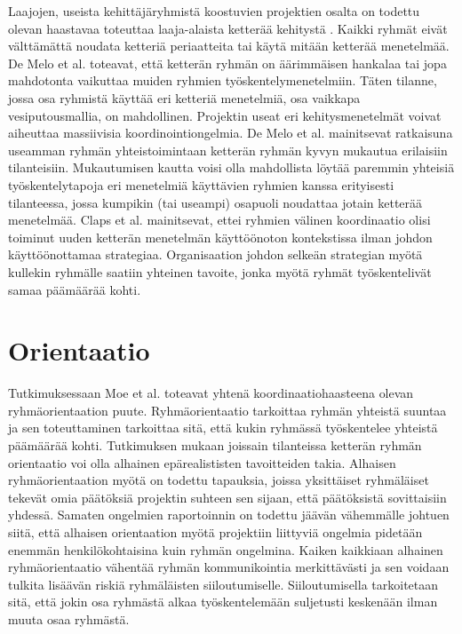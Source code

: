 Laajojen, useista kehittäjäryhmistä koostuvien projektien osalta on todettu olevan haastavaa toteuttaa laaja-alaista ketterää kehitystä \cite{DEOMELO2013412}. Kaikki ryhmät eivät välttämättä noudata ketteriä periaatteita tai käytä mitään ketterää menetelmää. De Melo et al. \cite{DEOMELO2013412} toteavat, että ketterän ryhmän on äärimmäisen hankalaa tai jopa mahdotonta vaikuttaa muiden ryhmien työskentelymenetelmiin. Täten tilanne, jossa osa ryhmistä käyttää eri ketteriä menetelmiä, osa vaikkapa vesiputousmallia, on mahdollinen. Projektin useat eri kehitysmenetelmät voivat aiheuttaa massiivisia koordinointiongelmia. De Melo et al. mainitsevat ratkaisuna useamman ryhmän yhteistoimintaan ketterän ryhmän kyvyn mukautua erilaisiin tilanteisiin. Mukautumisen kautta voisi olla mahdollista löytää paremmin yhteisiä työskentelytapoja eri menetelmiä käyttävien ryhmien kanssa erityisesti tilanteessa, jossa kumpikin (tai useampi) osapuoli noudattaa jotain ketterää menetelmää. Claps et al. \cite{CLAPS201521} mainitsevat, ettei ryhmien välinen koordinaatio olisi toiminut uuden ketterän menetelmän käyttöönoton kontekstissa ilman johdon käyttöönottamaa strategiaa. Organisaation johdon selkeän strategian myötä kullekin ryhmälle saatiin yhteinen tavoite, jonka myötä ryhmät työskentelivät samaa päämäärää kohti.

\section{Orientaatio}

Tutkimuksessaan Moe et al. \cite{MOE2012853} toteavat yhtenä koordinaatiohaasteena olevan ryhmäorientaation puute. Ryhmäorientaatio tarkoittaa ryhmän yhteistä suuntaa ja sen toteuttaminen tarkoittaa sitä, että kukin ryhmässä työskentelee yhteistä päämäärää kohti. Tutkimuksen mukaan joissain tilanteissa ketterän ryhmän orientaatio voi olla alhainen epärealististen tavoitteiden takia. Alhaisen ryhmäorientaation myötä on todettu tapauksia, joissa yksittäiset ryhmäläiset tekevät omia päätöksiä projektin suhteen sen sijaan, että päätöksistä sovittaisiin yhdessä. Samaten ongelmien raportoinnin on todettu jäävän vähemmälle johtuen siitä, että alhaisen orientaation myötä projektiin liittyviä ongelmia pidetään enemmän henkilökohtaisina kuin ryhmän ongelmina. Kaiken kaikkiaan alhainen ryhmäorientaatio vähentää ryhmän kommunikointia merkittävästi ja sen voidaan tulkita lisäävän riskiä ryhmäläisten siiloutumiselle. Siiloutumisella tarkoitetaan sitä, että jokin osa ryhmästä alkaa työskentelemään suljetusti keskenään ilman muuta osaa ryhmästä.
